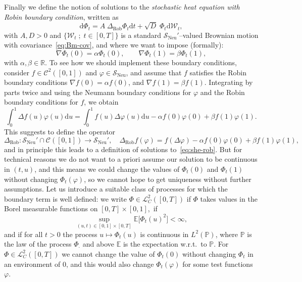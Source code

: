 \documentclass[AHL,Unicode,longabstracts]{cedram}
\DeclareMathOperator{\Neu}{Neu}
\DeclareMathOperator{\Rob}{Rob}
\newcommand{\bb}[1]{{\mathbb #1}}
\newcommand{\RR}{\mathbb R}
\newcommand{\mc}[1]{{\mathcal #1}}
\renewcommand{\mc}[1]{{\mathcal #1}}
\newcommand{\SN}{\ensuremath{\mc S_{\Neu}}}
\newcommand*{\dd}{\mathrm{d}}
\newcommand*{\dt}{\dd t}
\newcommand*{\du}{\dd u}
\begin{document}
Finally we define the notion of solutions to the \emph{stochastic heat equation with Robin boundary condition}, written as
\begin{equation}\label{eq:she-rob}
\dd \Phi_t = A\; \Delta_{\mathrm{Rob}} \Phi_t \dt + \sqrt{D}\; \Phi_t \dd\mc W_t,
\end{equation}
with $A, D>0$ and $\{\mc W_t\; ; \; t\in[0,T]\}$ is a standard $\SN'$--valued Brownian motion with covariance~\eqref{eq:Bm-cov}, and where we want to impose (formally):
\begin{equation}\label{eq:BC-rob}
\nabla \Phi_t(0) = \alpha \Phi_t(0), \qquad \nabla \Phi_t(1) = \beta \Phi_t(1),
\end{equation}
with $\alpha, \beta \in \RR$. To see how we should implement these boundary conditions, consider $f \in \mc C^2([0,1])$ and $\varphi \in \SN$, and assume that $f$ satisfies the Robin boundary conditions $\nabla f(0) = \alpha f(0)$, and $\nabla f(1) = \beta f(1)$. Integrating by parts twice and using the Neumann boundary conditions for $\varphi$ and the Robin boundary conditions for $f$, we obtain
\[
\int_0^1 \Delta f(u) \varphi(u) \du = \int_0^1 f(u) \Delta \varphi(u) \du - \alpha f(0) \varphi(0) + \beta f(1) \varphi(1).
\]
This suggests to define the operator
\[
\Delta_{\Rob} \colon \SN'\cap\mc C([0,1]) \to \SN',\quad \Delta_{\Rob} f(\varphi) = f(\Delta \varphi) - \alpha f(0) \varphi(0) + \beta f(1) \varphi(1),
\]
and in principle this leads to a definition of solutions to~\eqref{eq:she-rob}. But for technical reasons we do not want to a priori assume our solution to be continuous in $(t,u)$, and this means we could change the values of $\Phi_t(0)$ and $\Phi_t(1)$ without changing $\Phi_t(\varphi)$, so we cannot hope to get uniqueness without further assumptions. Let us introduce a suitable class of processes for which the boundary term is well defined: we write $\Phi \in \mc L^2_C([0,T])$ if $\Phi$ takes values in the Borel measurable functions on $[0,T] \times [0,1]$,~if
\[
\sup_{(u,t) \in [0,1] \times [0,T]} \bb E\big[\Phi_t(u)^2\big] < \infty,
\]
and if for all $t > 0$ the process $u \mapsto \Phi_t(u)$ is continuous in $L^2(\bb P)$, where $\bb P$ is the law of the process $\Phi_\cdot$ and above $\bb E$ is the expectation w.r.t.~to $\bb P$. For $\Phi \in \mc L^2_C([0,T])$ we cannot change the value of $\Phi_t(0)$ without changing $\Phi_t$ in an environment of $0$, and this would also change $\Phi_t(\varphi)$ for some test functions $\varphi$.
\end{document}
